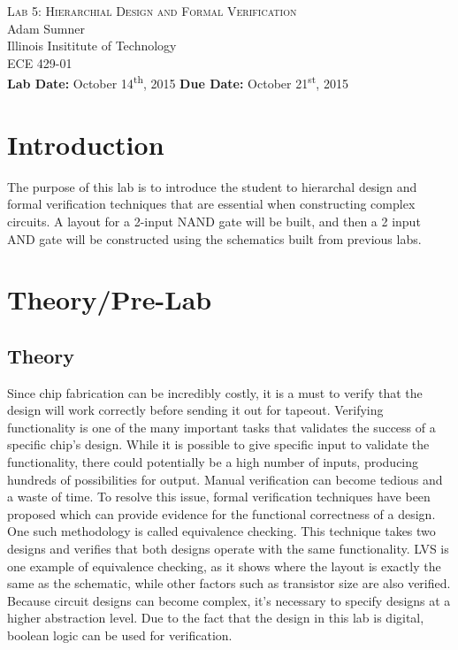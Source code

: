 \documentclass[12pt]{article}
\begin{document}
\begin{titlepage}
	\begin{center}
		
		
		\vfill
		
		\textsc{\LARGE Lab 5: Hierarchial Design and Formal Verification}\\[1.5cm]
		
		\Large Adam Sumner\\[0.5cm]
		
		\Large Illinois Insititute of Technology\\[0.5cm]
		
		\Large ECE 429-01\\[0.5cm]	
		
		\noindent
		\vfill
		\large \textbf{Lab Date:} October 14\textsuperscript{th}, 2015\hfill
		\large \textbf{Due Date:} October 21\textsuperscript{st}, 2015
	
		
	\end{center}
\end{titlepage}

\section{Introduction}
The purpose of this lab is to introduce the student to hierarchal design and formal verification techniques that are essential when constructing complex circuits. A layout for a 2-input NAND gate will be built, and then a 2 input AND gate will be constructed using the schematics built from previous labs.
\section{Theory/Pre-Lab}
\subsection{Theory}
Since chip fabrication can be incredibly costly, it is a must to verify that the design will work correctly before sending it out for tapeout. Verifying functionality is one of the many important tasks that validates the success of a specific chip's design. While it is possible to give specific input to validate the functionality, there could potentially be a high number of inputs, producing hundreds of possibilities for output. Manual verification can become tedious and a waste of time. To resolve this issue, formal verification techniques have been proposed which can provide evidence for the functional correctness of a design. One such methodology is called equivalence checking. This technique takes two designs and verifies that both designs operate with the same functionality. LVS is one example of equivalence checking, as it shows where the layout is exactly the same as the schematic, while other factors such as transistor size are also verified. Because circuit designs can become complex, it's necessary to specify designs at a higher abstraction level. Due to the fact that the design in this lab is digital, boolean logic can be used for verification.
\end{document}
